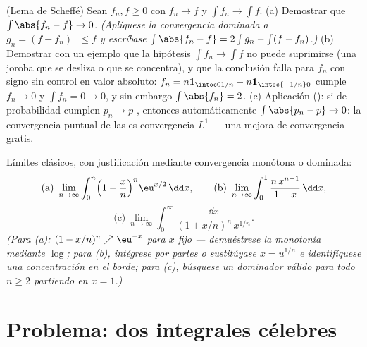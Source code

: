 \begin{exercise}[$\star\star$]\label{exo:b3:lebesgue:11}
(Lema de Scheffé) Sean $f_n, f \geq 0$
 con $f_n \to f$  y $\int f_n \to \int f$. (a) Demostrar que
$\int\abs{f_n - f} \to 0$. \emph{(Aplíquese la convergencia dominada a
$g_n = (f - f_n)^+ \leq f$ y escríbase
$\int\abs{f_n - f} = 2\int g_n - \int(f - f_n)$.)} (b) Demostrar con un
ejemplo que la hipótesis $\int f_n \to \int
f$ no puede suprimirse (una joroba que se desliza o que se concentra), y
que la conclusión falla para $f_n$ con signo sin control en valor
absoluto: $f_n = n\mathbf 1_{\intoc0{1/n}} -
n\mathbf 1_{\intoc{-1/n}0}$ cumple $f_n \to 0$  y
$\int f_n
= 0 \to 0$, y sin embargo $\int\abs{f_n} = 2$. (c) Aplicación
(): si  de probabilidad cumplen $p_n
\to p$ , entonces automáticamente
$\int\abs{p_n - p} \to 0$: la convergencia puntual de las  es
convergencia $L^1$ --- una mejora de convergencia gratis.
\end{exercise}

\begin{exercise}[$\star\star$]\label{exo:b3:lebesgue:12}
Límites clásicos, con justificación  mediante convergencia
monótona o dominada:
\[
\text{(a)}\ \lim_{n\to\infty}\int_0^n\Bigl(1 -
\frac xn\Bigr)^n\eu^{x/2}\,\dd x, \qquad
\text{(b)}\ \lim_{n\to\infty}\int_0^1\frac{n\,x^{n-1}}{1 +
x}\,\dd x,
\]
\[
\text{(c)}\ \lim_{n\to\infty}\int_0^\infty
\frac{\dd x}{(1 + x/n)^n\,x^{1/n}} .
\]
\emph{(Para (a): $(1 - x/n)^n \nearrow \eu^{-x}$ para $x$ fijo ---
demuéstrese la monotonía mediante $\log$; para (b), intégrese por partes
o sustitúyase $x = u^{1/n}$ e identifíquese una concentración en el
borde; para (c), búsquese un dominador
 válido para todo $n \geq 2$
partiendo en $x =
1$.)}
\end{exercise}

\section{Problema: dos integrales célebres}

